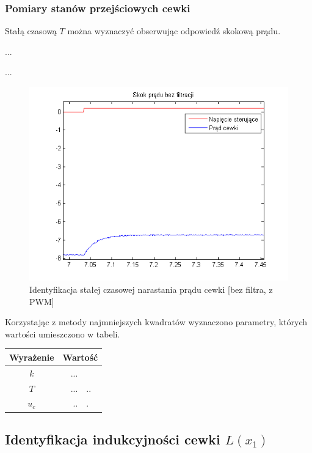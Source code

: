 \subsubsection{Pomiary stanów przejściowych cewki}

Stałą czasową $T$ można wyznaczyć obserwując odpowiedź skokową prądu.


...

...


\begin{figure}[!htb]
\centering
\includegraphics[scale=0.85]{img/skok_pradu_bezfiltra_pwm_szybkie.png}
\caption{Identyfikacja stałej czasowej narastania prądu cewki [bez filtra, z PWM]}
\label{rys:skok_pradu_bezfiltra}
\end{figure}


Korzystając z metody najmniejszych kwadratów wyznaczono parametry, których wartości umieszczono w tabeli.

\begin{tabular}{c r @{,} l}
Wyrażenie &
\multicolumn{2}{c}{Wartość}\\ \hline
$k$ & ... \\
$T$ & ...&.. \\
$u_c$ & ..&. \\
\end{tabular}



\subsection{Identyfikacja indukcyjności cewki $L(x_1)$}

